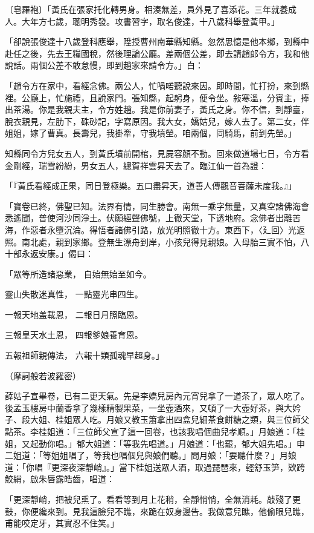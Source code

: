 \begin{showcontents}{}
〔皂羅袍〕「黃氏在張家托化轉男身。相湊無差，員外見了喜添花。三年就養成人。大年方七歲，聰明秀發。攻書習字，取名俊達，十八歲科舉登黃甲。」

「卻說張俊達十八歲登科應舉，陞授曹州南華縣知縣。忽然思憶是他本鄉，到縣中赴任之後，先去王糧國稅，然後理論公廳。差兩個公差，即去請趙郎令方，我和他說話。兩個公差不敢怠慢，即到趙家來請令方。」白：

「趙令方在家中，看經念佛。兩公人，忙喎喏聽說來因。即時間，忙打扮，來到縣裡。公廳上，忙施禮，且說家門。張知縣，起躬身，便令坐。敍寒溫，分賓主，捧出茶湯。你是我親夫主，令方姓趙。我是你前妻子，黃氏之身。你不信，到靜臺，脫衣親見，左肋下，硃砂記，字寫原因。我大女，嬌姑兒，嫁人去了。第二女，伴姐姐，嫁了曹真。長壽兒，我掛牽，守我墳塋。咱兩個，同騎馬，前到先塋。」

知縣同令方兒女五人，到黃氏墳前開棺，見屍容顏不動。回來做道場七日，令方看金剛經，瑞雪紛紛，男女五人，總賀祥雲昇天去了。臨江仙一首為證：

「『黃氏看經成正果，同日登極樂。五口盡昇天，道善人傳觀音菩薩未度我。』」

「寶卷已終，佛聖已知。法界有情，同生勝會。南無一乘字無量，又真空諸佛海會悉遙聞，普使河沙同淨土。伏願經聲佛號，上徹天堂，下透地府。念佛者出離苦海，作惡者永墮沉淪。得悟者諸佛引路，放光明照徹十方。東西下，〈廴回〉光返照。南北處，親到家鄉。登無生漂舟到岸，小孩兒得見親娘。入母胎三實不怕，八十部永返安康。」偈曰：

「眾等所造諸惡業，  自始無始至如今。

靈山失散迷真性，  一點靈光串四生。

一報天地盖載恩，  二報日月照臨恩。

三報皇天水土恩，  四報爹娘養育恩。

五報祖師親傳法，  六報十類孤魂早超身。」

（摩訶般若波羅密）

薛姑子宣畢卷，已有二更天氣。先是李嬌兒房內元宵兒拿了一道茶了，眾人吃了。後孟玉樓房中蘭香拿了幾樣精製果菜，一坐壺酒來，又頓了一大壺好茶，與大妗子、段大姐、桂姐眾人吃。月娘又教玉簫拿出四盒兒細茶食餅糖之類，與三位師父點茶。李桂姐道：「三位師父宣了這一回卷，也該我唱個曲兒孝順。」月娘道：「桂姐，又起動你唱。」郁大姐道：「等我先唱道。」月娘道：「也罷，郁大姐先唱。」申二姐道：「等姐姐唱了，等我也唱個兒與娘們聽。」問月娘：「要聽什麼？」月娘道：「你唱『更深夜深靜峭』。」當下桂姐送眾人酒，取過琵琶來，輕舒玉笋，欵跨鮫綃，啟朱唇露皓齒，唱道：

「更深靜峭，把被兒熏了。看看等到月上花稍，全靜悄悄，全無消耗。敲殘了更鼓，你便纔來到。見我這臉兒不瞧，來跪在奴身邊告。我做意兒瞧，他偷眼兒瞧，甫能咬定牙，其實忍不住笑。」


\end{showcontents}
